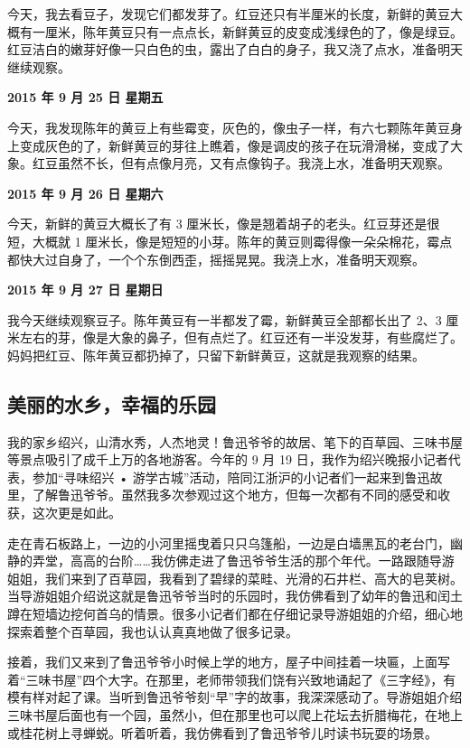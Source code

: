 \documentclass[UTF8,a4paper,titlepage,twoside,10.5pt]{article}
\begin{document}
今天，我去看豆子，发现它们都发芽了。红豆还只有半厘米的长度，新鲜的黄豆大概有一厘米，陈年黄豆只有一点点长，新鲜黄豆的皮变成浅绿色的了，像是绿豆。红豆洁白的嫩芽好像一只白色的虫，露出了白白的身子，我又浇了点水，准备明天继续观察。

\textbf{2015 年 9 月 25 日    星期五}

今天，我发现陈年的黄豆上有些霉变，灰色的，像虫子一样，有六七颗陈年黄豆身上变成灰色的了，新鲜黄豆的芽往上瞧着，像是调皮的孩子在玩滑滑梯，变成了大象。红豆虽然不长，但有点像月亮，又有点像钩子。我浇上水，准备明天观察。

\textbf{2015 年 9 月 26 日    星期六}

今天，新鲜的黄豆大概长了有 3 厘米长，像是翘着胡子的老头。红豆芽还是很短，大概就 1 厘米长，像是短短的小芽。陈年的黄豆则霉得像一朵朵棉花，霉点都快大过自身了，一个个东倒西歪，摇摇晃晃。我浇上水，准备明天观察。

\textbf{2015 年 9 月 27 日    星期日}

我今天继续观察豆子。陈年黄豆有一半都发了霉，新鲜黄豆全部都长出了 2、3 厘米左右的芽，像是大象的鼻子，但有点烂了。红豆还有一半没发芽，有些腐烂了。妈妈把红豆、陈年黄豆都扔掉了，只留下新鲜黄豆，这就是我观察的结果。

\subsection{美丽的水乡，幸福的乐园}
\label{sec:org2ac4e71}

我的家乡绍兴，山清水秀，人杰地灵！鲁迅爷爷的故居、笔下的百草园、三味书屋等景点吸引了成千上万的各地游客。今年的 9 月 19 日，我作为绍兴晚报小记者代表，参加“寻味绍兴 • 游学古城”活动，陪同江浙沪的小记者们一起来到鲁迅故里，了解鲁迅爷爷。虽然我多次参观过这个地方，但每一次都有不同的感受和收获，这次更是如此。

走在青石板路上，一边的小河里摇曳着只只乌篷船，一边是白墙黑瓦的老台门，幽静的弄堂，高高的台阶……我仿佛走进了鲁迅爷爷生活的那个年代。一路跟随导游姐姐，我们来到了百草园，我看到了碧绿的菜畦、光滑的石井栏、高大的皂荚树。当导游姐姐介绍说这就是鲁迅爷爷当时的乐园时，我仿佛看到了幼年的鲁迅和闰土蹲在短墙边挖何首乌的情景。很多小记者们都在仔细记录导游姐姐的介绍，细心地探索着整个百草园，我也认认真真地做了很多记录。

接着，我们又来到了鲁迅爷爷小时候上学的地方，屋子中间挂着一块匾，上面写着“三味书屋”四个大字。在那里，老师带领我们饶有兴致地诵起了《三字经》，有模有样对起了课。当听到鲁迅爷爷刻“早”字的故事，我深深感动了。导游姐姐介绍三味书屋后面也有一个园，虽然小，但在那里也可以爬上花坛去折腊梅花，在地上或桂花树上寻蝉蜕。听着听着，我仿佛看到了鲁迅爷爷儿时读书玩耍的场景。
\end{document}
